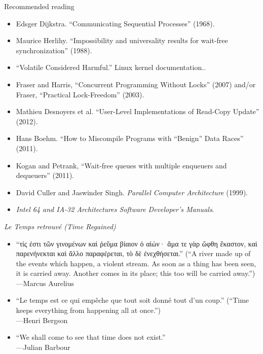 \documentclass[xcolor={dvipsnames,table}]{beamer}
\begin{document}
\begin{frame}{Recommended reading}
\small
\begin{itemize}
\item Edsger Dijkstra. ``Communicating Sequential Processes'' (1968).
\item Maurice Herlihy. ``Impossibility and universality results for wait-free synchronization'' (1988).
\item ``Volatile Considered Harmful.'' Linux kernel documentation..
\item Fraser and Harris, ``Concurrent Programming Without Locks'' (2007) and/or Fraser,
	``Practical Lock-Freedom'' (2003).
\item Mathieu Desnoyers et al. ``User-Level Implementations of Read-Copy Update'' (2012).
\item Hans Boehm. ``How to Miscompile Programs with ``Benign'' Data Races'' (2011).
\item Kogan and Petrank, ``Wait-free queues with multiple enqueuers and dequeuers'' (2011).
\item David Culler and Jaswinder Singh. \textit{Parallel Computer Architecture} (1999). 
\item \textit{Intel 64 and IA-32 Architectures Software Developer's Manuals}.
\end{itemize}
\end{frame}

\begin{frame}{\textit{Le Temps retrouvé (Time Regained)}}
\begin{itemize}
\item `` τίς ἐστι τῶν γινομένων καὶ ῥεῦμα βίαιον ὁ αἰών· ἅμα
τε γὰρ ὤφθη ἕκαστον, καὶ παρενήνεκται καὶ ἄλλο παραφέρεται, τὸ δὲ
ἐνεχθήσεται.\latintext'' (``A river made up of the events which
happen, a violent stream. As soon as a thing has been seen, it is
carried away. Another comes in its place; this too will be carried away.'')\\ \hfill---Marcus Aurelius
\vspace{.1in}
\item {}``Le temps est ce qui empêche que tout soit donné tout d'un coup.'' \latintext (``Time
	keeps everything from happening all at once.'')\\ \hfill---Henri Bergson
\vspace{.1in}
\item ``We shall come to see that time does not exist.''\\ \hfill---Julian Barbour
\end{itemize}
\end{frame}
\end{document}
